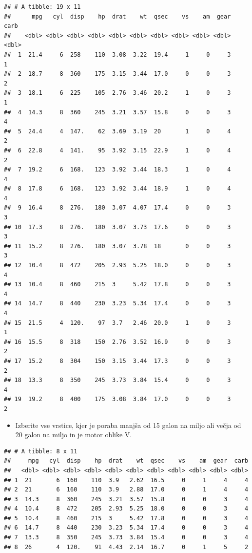 \documentclass[
]{book}
\providecommand{\tightlist}{%
  \setlength{\itemsep}{0pt}\setlength{\parskip}{0pt}}
\begin{document}
\begin{enumerate}
\begin{verbatim}
## # A tibble: 19 x 11
##      mpg   cyl  disp    hp  drat    wt  qsec    vs    am  gear  carb
##    <dbl> <dbl> <dbl> <dbl> <dbl> <dbl> <dbl> <dbl> <dbl> <dbl> <dbl>
##  1  21.4     6  258    110  3.08  3.22  19.4     1     0     3     1
##  2  18.7     8  360    175  3.15  3.44  17.0     0     0     3     2
##  3  18.1     6  225    105  2.76  3.46  20.2     1     0     3     1
##  4  14.3     8  360    245  3.21  3.57  15.8     0     0     3     4
##  5  24.4     4  147.    62  3.69  3.19  20       1     0     4     2
##  6  22.8     4  141.    95  3.92  3.15  22.9     1     0     4     2
##  7  19.2     6  168.   123  3.92  3.44  18.3     1     0     4     4
##  8  17.8     6  168.   123  3.92  3.44  18.9     1     0     4     4
##  9  16.4     8  276.   180  3.07  4.07  17.4     0     0     3     3
## 10  17.3     8  276.   180  3.07  3.73  17.6     0     0     3     3
## 11  15.2     8  276.   180  3.07  3.78  18       0     0     3     3
## 12  10.4     8  472    205  2.93  5.25  18.0     0     0     3     4
## 13  10.4     8  460    215  3     5.42  17.8     0     0     3     4
## 14  14.7     8  440    230  3.23  5.34  17.4     0     0     3     4
## 15  21.5     4  120.    97  3.7   2.46  20.0     1     0     3     1
## 16  15.5     8  318    150  2.76  3.52  16.9     0     0     3     2
## 17  15.2     8  304    150  3.15  3.44  17.3     0     0     3     2
## 18  13.3     8  350    245  3.73  3.84  15.4     0     0     3     4
## 19  19.2     8  400    175  3.08  3.84  17.0     0     0     3     2
\end{verbatim}

  \begin{itemize}
  \tightlist
  \item
    Izberite vse vrstice, kjer je poraba manjša od 15 galon na miljo ali večja od 20 galon na miljo in je motor oblike V.
  \end{itemize}

\begin{verbatim}
## # A tibble: 8 x 11
##     mpg   cyl  disp    hp  drat    wt  qsec    vs    am  gear  carb
##   <dbl> <dbl> <dbl> <dbl> <dbl> <dbl> <dbl> <dbl> <dbl> <dbl> <dbl>
## 1  21       6  160    110  3.9   2.62  16.5     0     1     4     4
## 2  21       6  160    110  3.9   2.88  17.0     0     1     4     4
## 3  14.3     8  360    245  3.21  3.57  15.8     0     0     3     4
## 4  10.4     8  472    205  2.93  5.25  18.0     0     0     3     4
## 5  10.4     8  460    215  3     5.42  17.8     0     0     3     4
## 6  14.7     8  440    230  3.23  5.34  17.4     0     0     3     4
## 7  13.3     8  350    245  3.73  3.84  15.4     0     0     3     4
## 8  26       4  120.    91  4.43  2.14  16.7     0     1     5     2
\end{verbatim}


\end{enumerate}
\end{document}
